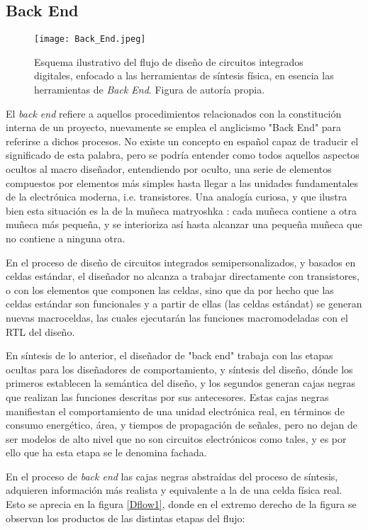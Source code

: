 \newpage
\subsection{Back End}

\begin{figure}[h]
\texttt{[image: Back\_End.jpeg]}
\centering
\caption{Esquema ilustrativo del flujo de diseño de circuitos integrados digitales, enfocado a las herramientas de síntesis física, en esencia las herramientas de \textit{Back End}. Figura de autoría propia.}
\label{be}
\end{figure}

El \textit{back end} refiere a aquellos procedimientos relacionados con la constitución interna de un proyecto, nuevamente se emplea el anglicismo "Back End" para referirse a dichos procesos. No existe un concepto en español capaz de traducir el significado de esta palabra, pero se podría entender como todos aquellos aspectos ocultos al macro diseñador, entendiendo por oculto, una serie de elementos compuestos por elementos más simples hasta llegar a las unidades fundamentales de la electrónica moderna, i.e. transistores. Una analogía curiosa, y que ilustra bien esta situación es la de la muñeca matryoshka \cite{book:matryoshka}: cada muñeca contiene a otra muñeca más pequeña, y se interioriza así hasta alcanzar una pequeña muñeca que no contiene a ninguna otra.

En el proceso de diseño de circuitos integrados semipersonalizados, y basados en celdas estándar, el diseñador no alcanza a trabajar directamente con transistores, o con los elementos que componen las celdas, sino  que da por hecho que las celdas estándar son funcionales y a partir de ellas (las celdas estándat) se generan nuevas macroceldas, las cuales ejecutarán las funciones macromodeladas con el RTL del diseño.

En síntesis de lo anterior, el diseñador de "back end" trabaja con las etapas ocultas para los diseñadores de comportamiento, y síntesis del diseño, dónde los primeros establecen la semántica del diseño, y los segundos generan cajas negras que realizan las funciones descritas por sus antecesores. Estas cajas negras manifiestan el comportamiento de una unidad electrónica real, en términos de consumo energético, área, y tiempos de propagación de señales, pero no dejan de ser modelos de alto nivel que no son circuitos electrónicos como tales, y es por ello que ha esta etapa se le denomina fachada.

En el proceso de \textit{back end} las cajas negras abstraídas del proceso de síntesis, adquieren información más realista y equivalente a la de una celda física real. Esto se aprecia en la figura \ref{Dflow1}, donde en el extremo derecho de la figura se observan los productos de las distintas etapas del flujo: 

